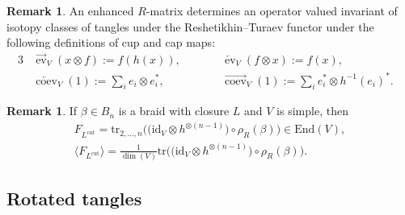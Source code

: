 \documentclass[pdftex]{sigma}
\numberwithin{equation}{section}
\theoremstyle{definition}
\newtheorem{Remark}[Theorem]{Remark}
\begin{document}
\begin{Remark}
\label{rem.cups}
An enhanced $R$-matrix determines an operator valued invariant of isotopy classes
of tangles under the Reshetikhin--Turaev functor under the following definitions of
cup and cap maps:
\begin{alignat*}{3}
& \overrightarrow{\operatorname{ev}}_V(x \otimes f) := f(h(x)), \qquad &&
\overleftarrow{\operatorname{ev}}_V(f \otimes x) := f(x), &\\
& \overleftarrow{\operatorname{coev}}_V(1) := \sum_{i} e_i \otimes e_i^\ast, \qquad &&
\overrightarrow{\operatorname{coev}}_V(1) := \sum_{i} e_i^\ast \otimes h^{-1}(e_i)^\ast .&
\end{alignat*}
\end{Remark}

\begin{Remark}
\label{rem.Lcut}
If $\beta\in B_n$ is a braid with closure $L$ {and $V$ is simple}, then
\begin{gather*}
F_{L^{\mathrm{cut}}} =
\mathrm{tr}_{2,\dots, n}\bigl(\bigl(\mathrm{id}_V\otimes
h^{\otimes (n-1)}\bigr)\circ \rho_R(\beta) \bigr)\in \mathrm{End}(V),
\\
\langle F_{L^{\mathrm{cut}}}\rangle
=
\frac{1}{\dim(V)}
\mathrm{tr}\bigl(\bigl(\mathrm{id}_V\otimes
h^{\otimes (n-1)}\bigr)\circ \rho_R(\beta)\bigr) .
\end{gather*}
\end{Remark}

\subsection{Rotated tangles}
\end{document}
